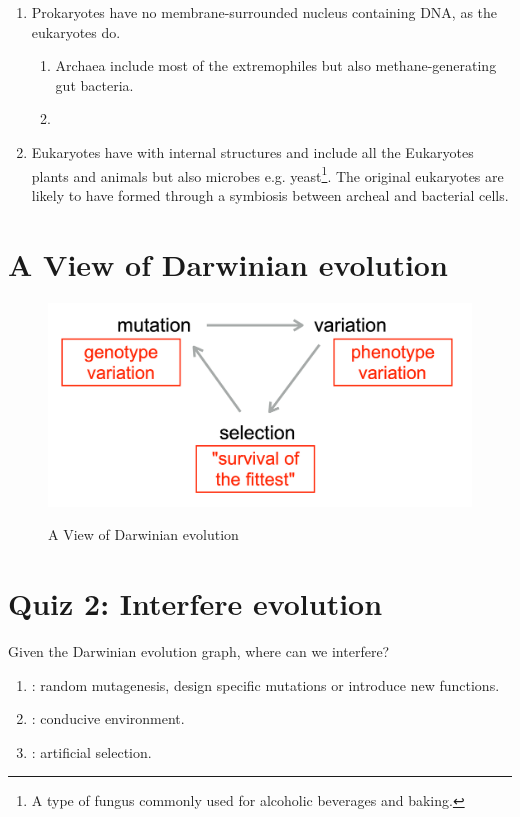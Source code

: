 \begin{enumerate}
    \item {} Prokaryotes have no membrane-surrounded nucleus containing DNA, as the eukaryotes do.
    \begin{enumerate}
        \item {} Archaea include most of the extremophiles but also methane-generating gut bacteria.
        \item {}
    \end{enumerate}
    \item {} Eukaryotes have  with  internal structures and include all the Eukaryotes plants and animals but also microbes e.g. yeast\footnote{A type of fungus commonly used for alcoholic beverages and baking.}. The original eukaryotes are likely to have formed through a symbiosis between archeal and bacterial cells.
\end{enumerate}


\section{A View of Darwinian evolution}

\begin{figure}[h]
\centering
\includegraphics[width=1\textwidth]{images/lecture1.png}\\[.2in]
\caption{A View of Darwinian evolution} 
\end{figure}


\section{Quiz 2: Interfere evolution}
Given the Darwinian evolution graph, where can we interfere?
\begin{enumerate}
    \item {}: random mutagenesis, design specific mutations or introduce new functions.
    \item {}: conducive environment.
    \item {}: artificial selection.
\end{enumerate}
